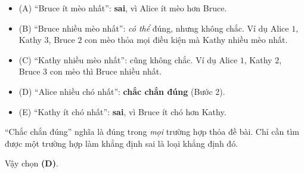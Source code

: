 {
\begin{itemize}[leftmargin=1.3em,itemsep=1pt]
\item (A) ``Bruce ít mèo nhất'': \textbf{sai}, vì Alice ít mèo hơn Bruce.
\item (B) ``Bruce nhiều mèo nhất'': \emph{có thể} đúng, nhưng không chắc. Ví dụ Alice $1$, Kathy $3$, Bruce $2$ con mèo thỏa mọi điều kiện mà Kathy nhiều mèo nhất.
\item (C) ``Kathy nhiều mèo nhất'': cũng không chắc. Ví dụ Alice $1$, Kathy $2$, Bruce $3$ con mèo thì Bruce nhiều nhất.
\item (D) ``Alice nhiều chó nhất'': \textbf{chắc chắn đúng} (Bước 2).
\item (E) ``Kathy ít chó nhất'': \textbf{sai}, vì Bruce ít chó hơn Kathy.
\end{itemize}
\begin{warnbox}``Chắc chắn đúng'' nghĩa là đúng trong \emph{mọi} trường hợp thỏa đề bài. Chỉ cần tìm được một trường hợp làm khẳng định sai là loại khẳng định đó.\end{warnbox}
Vậy chọn \textbf{(D)}.
}

